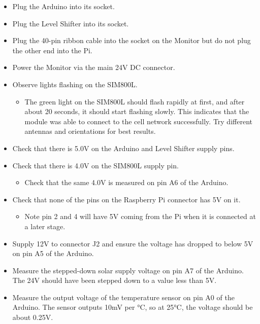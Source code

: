 \documentclass[
  letterpaper,
]{scrbook}
\providecommand{\tightlist}{%
  \setlength{\itemsep}{0pt}\setlength{\parskip}{0pt}}
\begin{document}
\begin{itemize}
\item
  Plug the Arduino into its socket.
\item
  Plug the Level Shifter into its socket.
\item
  Plug the 40-pin ribbon cable into the socket on the Monitor but do not
  plug the other end into the Pi.
\item
  Power the Monitor via the main 24V DC connector.
\item
  Observe lights flashing on the SIM800L.

  \begin{itemize}
  \tightlist
  \item
    The green light on the SIM800L should flash rapidly at first, and
    after about 20 seconds, it should start flashing slowly. This
    indicates that the module was able to connect to the cell network
    successfully. Try different antennas and orientations for best
    results.
  \end{itemize}
\item
  Check that there is 5.0V on the Arduino and Level Shifter supply pins.
\item
  Check that there is 4.0V on the SIM800L supply pin.

  \begin{itemize}
  \tightlist
  \item
    Check that the same 4.0V is measured on pin A6 of the Arduino.
  \end{itemize}
\item
  Check that none of the pins on the Raspberry Pi connector has 5V on
  it.

  \begin{itemize}
  \tightlist
  \item
    Note pin 2 and 4 will have 5V coming from the Pi when it is
    connected at a later stage.
  \end{itemize}
\item
  Supply 12V to connector J2 and ensure the voltage has dropped to below
  5V on pin A5 of the Arduino.
\item
  Measure the stepped-down solar supply voltage on pin A7 of the
  Arduino. The 24V should have been stepped down to a value less than
  5V.
\item
  Measure the output voltage of the temperature sensor on pin A0 of the
  Arduino. The sensor outputs 10mV per °C, so at 25°C, the voltage
  should be about 0.25V.
\end{itemize}
\end{document}
